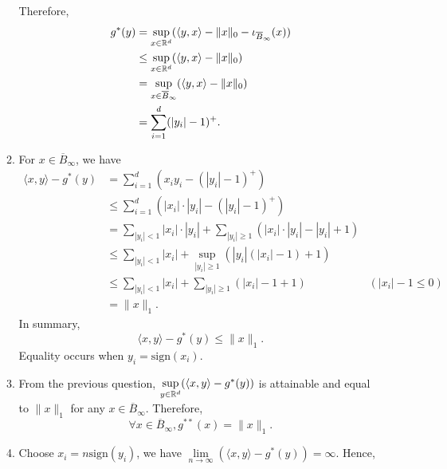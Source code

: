 \begin{enumerate}
\begin{enumerate}[label=(\alph*)]
                Therefore,
                \begin{align*}
                  g^*(y)
                   & = \sup\limits_{x\in{\mathbb{R}}^d} (\langle y,x\rangle - \|x\|_0 - \iota_{\overline{B}_{\infty}}(x)) \\
                   & \le \sup\limits_{x\in{\mathbb{R}}^d} (\langle y,x\rangle - \|x\|_0)                                  \\
                   & = \sup\limits_{x\in\overline{B}_{\infty}} (\langle y,x\rangle - \|x\|_0)                    \\
                   & = \sum\limits_{i=1}^d (|y_i| - 1)^+.
                \end{align*}
          \item For $x\in\overline{B}_{\infty}$, we have
                \begin{align*}
                  \langle x,y\rangle - g^*(y)
                   & = \sum\limits_{i=1}^d \left(x_iy_i - (|y_i|-1)^+ \right)                                                                             \\
                   & \le \sum\limits_{i=1}^d \left(|x_i|\cdot |y_i| - (|y_i|-1)^+ \right)                                                                 \\
                   & = \sum\limits_{|y_i| < 1} |x_i|\cdot |y_i| + \sum\limits_{|y_i| \ge 1}\left( |x_i|\cdot |y_i| - |y_i| + 1\right)                     \\
                   & \le \sum\limits_{|y_i| < 1} |x_i| + \sup\limits_{|y_i| \ge 1}\left( |y_i|(|x_i|-1) + 1\right)                                        \\
                   & \le \sum\limits_{|y_i| < 1} |x_i| + \sum\limits_{|y_i| \ge 1}\left( |x_i|-1 + 1\right)                           & (|x_i| - 1 \le 0) \\
                   & = \|x\|_1.
                \end{align*}
                In summary,
                $$\langle x,y\rangle - g^*(y) \le \|x\|_1.$$
                Equality occurs when $y_i = \mathrm{sign}(x_i)$.
          \item From the previous question, $\sup\limits_{y\in{\mathbb{R}}^d}(\langle x,y\rangle - g^*(y))$ is attainable and equal to $\|x\|_1$ for any $x\in \overline{B}_{\infty}$. Therefore,
                $$\forall x\in\overline{B}_{\infty}, g^{**}(x) = \|x\|_1.$$
          \item Choose $x_i = n\mathrm{sign}(y_i)$, we have $\lim\limits_{n\to\infty}(\langle x,y\rangle - g^*(y)) = \infty$. Hence,

\end{enumerate}
\end{enumerate}
